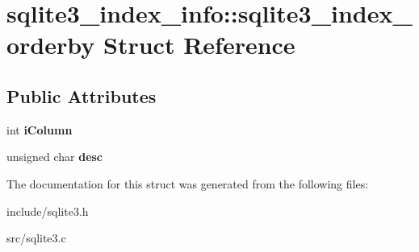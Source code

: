 \hypertarget{structsqlite3__index__info_1_1sqlite3__index__orderby}{\section{sqlite3\-\_\-index\-\_\-info\-:\-:sqlite3\-\_\-index\-\_\-orderby Struct Reference}
\label{structsqlite3__index__info_1_1sqlite3__index__orderby}
}
\subsection*{Public Attributes}
\begin{DoxyCompactItemize}
\item 
\hypertarget{structsqlite3__index__info_1_1sqlite3__index__orderby_a266396085bfda9acef3f13eaa170cd2f}{int {\bfseries i\-Column}}\label{structsqlite3__index__info_1_1sqlite3__index__orderby_a266396085bfda9acef3f13eaa170cd2f}

\item 
\hypertarget{structsqlite3__index__info_1_1sqlite3__index__orderby_a0586d1b5d36221af96aeba8cfc56e9c6}{unsigned char {\bfseries desc}}\label{structsqlite3__index__info_1_1sqlite3__index__orderby_a0586d1b5d36221af96aeba8cfc56e9c6}

\end{DoxyCompactItemize}


The documentation for this struct was generated from the following files\-:\begin{DoxyCompactItemize}
\item 
include/sqlite3.\-h\item 
src/sqlite3.\-c\end{DoxyCompactItemize}
